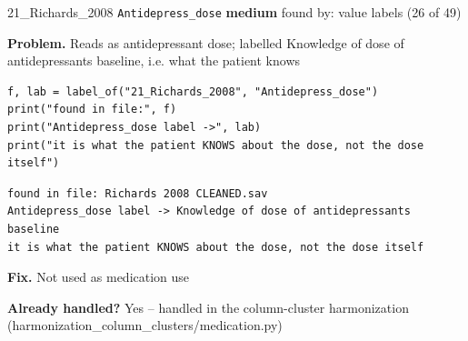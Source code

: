 \documentclass[9pt, t, handout]{beamer}
\newcommand{\ans}[1]{\textcolor{structure.fg}{#1}}
\begin{document}
\begin{frame}[fragile]{21\_Richards\_2008 \quad \texttt{Antidepress\_dose}}
  {\scriptsize\textcolor{blue!55!black}{\textbf{medium}} \quad
   found by: value labels \quad (26 of 49)}
  \vspace{3pt}

  {\footnotesize \textbf{Problem.} Reads as antidepressant dose; labelled Knowledge of dose of antidepressants baseline, i.e. what the patient knows}
  \vspace{4pt}

  \begin{Verbatim}[fontsize=\tiny, frame=single, framesep=2pt, label=\tiny reproduce]
f, lab = label_of("21_Richards_2008", "Antidepress_dose")
print("found in file:", f)
print("Antidepress_dose label ->", lab)
print("it is what the patient KNOWS about the dose, not the dose itself")
  \end{Verbatim}
  \begin{Verbatim}[fontsize=\tiny, frame=single, framesep=2pt, label=\tiny output]
found in file: Richards 2008 CLEANED.sav
Antidepress_dose label -> Knowledge of dose of antidepressants baseline
it is what the patient KNOWS about the dose, not the dose itself
  \end{Verbatim}
  \vspace{2pt}

  {\footnotesize \textbf{Fix.} Not used as medication use}
  \vspace{2pt}

  {\footnotesize \textbf{Already handled?} \ans{Yes} -- handled in the column-cluster harmonization
   (harmonization\_column\_clusters/medication.py)}
\end{frame}
\end{document}
